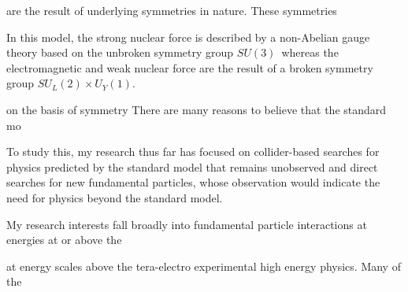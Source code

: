 \documentclass[12pt]{article}
\begin{document}
are the result of underlying symmetries in nature. These symmetries 

In this model, the strong nuclear force is described by a non-Abelian gauge theory based on the unbroken symmetry group $SU(3)$~whereas the electromagnetic and weak nuclear force are the result of a broken symmetry group $SU_{L}(2)\times U_{Y}(1)$.

on the basis of symmetry 
There are many reasons to believe that the standard mo

To study this, my research thus far has focused on collider-based searches for physics predicted by the standard model that remains unobserved and direct searches for new fundamental particles, whose observation would indicate the need for physics beyond the standard model. 

My research interests fall broadly into fundamental particle interactions at energies at or above the 

at energy scales above the tera-electro
experimental high energy physics. Many of the 
\end{document}
